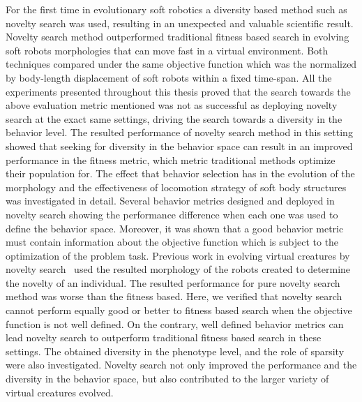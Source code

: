 For the first time in evolutionary soft robotics a diversity based method such as novelty search was used, resulting in an unexpected and valuable scientific result. Novelty search method outperformed traditional fitness based search in evolving soft robots morphologies that can move fast in a virtual environment. Both techniques compared under the same objective function which was the normalized by body-length displacement of soft robots within a fixed time-span. All the experiments presented throughout this thesis proved that the search towards the above evaluation metric mentioned was not as successful as deploying novelty search at the exact same settings, driving the search towards a diversity in the behavior level. The resulted performance of novelty search method in this setting showed that seeking for diversity in the behavior space can result in an improved performance in the fitness metric, which metric traditional methods optimize their population for. The effect that behavior selection has in the evolution of the morphology and the effectiveness of locomotion strategy of soft body structures was investigated in detail. Several behavior metrics designed and deployed in novelty search showing the performance difference when each one was used to define the behavior space. Moreover, it was shown that a good behavior metric must contain information about the objective function which is subject to the optimization of the problem task. Previous work in evolving virtual creatures by novelty search~\citep{lehman2011evolving} used the resulted morphology of the robots created to determine the novelty of an individual. The resulted performance for pure novelty search method was worse than the fitness based. Here, we verified that novelty search cannot perform equally good or better to fitness based search when the objective function is not well defined. On the contrary, well defined behavior metrics can lead novelty search to outperform traditional fitness based search in these settings. The obtained diversity in the phenotype level, and the role of sparsity were also investigated. Novelty search not only improved the performance and the diversity in the behavior space, but also contributed to the larger variety of virtual creatures evolved. 


